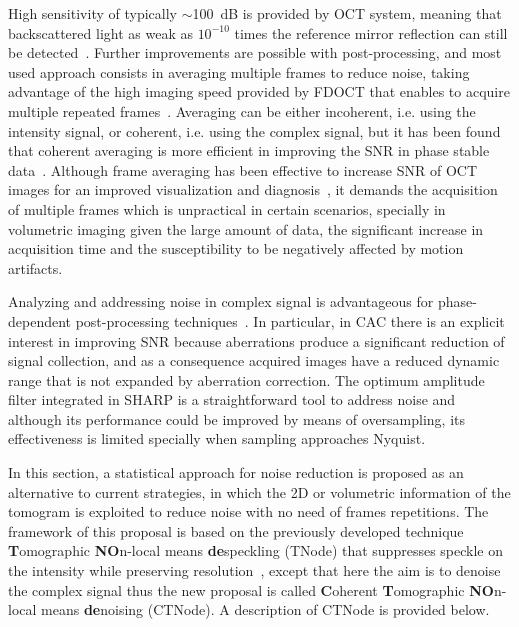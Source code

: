 High sensitivity of typically $\sim$100~dB is provided by OCT system, meaning that backscattered light as weak as $10^{-10}$ times the reference mirror reflection can still be detected~\cite{Choma2003_Sensitivity, deBoer2003_Improved}. Further improvements are possible with post-processing, and most used approach consists in averaging multiple frames to reduce noise, taking advantage of the high imaging speed provided by FDOCT that enables to acquire multiple repeated frames~\cite{Baumann2019_Signal, Szkulmowski2013_Averaging}. Averaging can be either incoherent, i.e. using the intensity signal, or coherent, i.e. using the complex signal, but it has been found that coherent averaging is more efficient in improving the SNR in phase stable data~\cite{Baumann2019_Signal}. Although frame averaging has been effective to increase SNR of OCT images for an improved visualization and diagnosis~\cite{Sakamoto2008_SpectralDomain}, it demands the acquisition of multiple frames which is unpractical in certain scenarios, specially in volumetric imaging given the large amount of data, the significant increase in acquisition time and the susceptibility to be negatively affected by motion artifacts. 

Analyzing and addressing noise in complex signal is advantageous for phase-dependent post-processing techniques~\cite{Uribe-Patarroyo2020_Noise}. In particular, in CAC there is an explicit interest in improving SNR because aberrations produce a significant reduction of signal collection, and as a consequence acquired images have a reduced dynamic range that is not expanded by aberration correction. The optimum amplitude filter integrated in SHARP is a straightforward tool to address noise and although its performance could be improved by means of oversampling, its effectiveness is limited specially when sampling approaches Nyquist.

In this section, a statistical approach for noise reduction is proposed as an alternative to current strategies, in which the 2D or volumetric information of the tomogram is exploited to reduce noise with no need of frames repetitions. The framework of this proposal is based on the previously developed technique \textbf{T}omographic \textbf{NO}n-local means \textbf{de}speckling (TNode) that suppresses speckle on the intensity while preserving resolution~\cite{Cuartas-Velez2018_Volumetric}, except that here the aim is to denoise the complex signal thus the new proposal is called \textbf{C}oherent \textbf{T}omographic \textbf{NO}n-local means \textbf{de}noising (CTNode). A description of CTNode is provided below.

